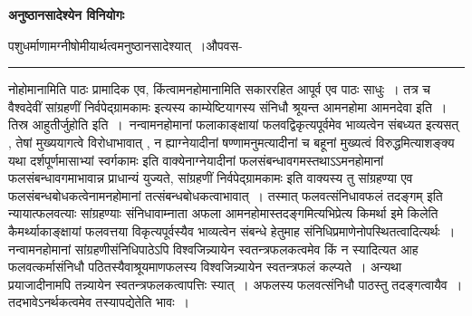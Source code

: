 \documentclass[11pt, openany]{book}
\begin{document}
\begin {center}
\textbf {अनुष्ठानसादेश्येन विनियोगः}
\end {center}

{\bl पशुधर्माणामग्नीषोमीयार्थत्वमनुष्ठानसादेश्यात्~।औपवस-\\}
\hrule
\vspace{3mm}
\noindent
नोहोमानामिति पाठः प्रामादिक एव, किंत्वामनहोमानामिति सकाररहित आपूर्व एव पाठः साधुः~। तत्र च {\qt वैश्वदेवीं सांग्रहणीं निर्वपेद्ग्रामकामः} इत्यस्य काम्येष्टियागस्य संनिधौ श्रूयन्त आमनहोमा {\qt आम\footnotemark नदेवा इति~। तिस्र आहुतीर्जुहोति} इति~।~{\br नन्वा}मनहोमानां फलाकाङ्क्षायां फलवद्विकृत्यपूर्वमेव भाव्यत्वेन संबध्यत इत्यसत् , तेषां मुख्ययागत्वे विरोधाभावात् , न ह्याग्नेयादीनां षण्णामनुमत्यादीनां च बहूनां मुख्यत्वं विरुद्धमित्याशङ्क्य यथा {\qt दर्शपूर्णमासाभ्यां स्वर्गकामः} इति
वाक्येनाग्नेयादीनां फलसंबन्धावगमस्तथाऽऽमनहोमानां फलसंबन्धावगमाभावान्न प्राधान्यं युज्यते, {\qt सांग्रहणीं निर्वपेद्ग्रामकामः} इति वाक्यस्य तु सांग्रहण्या एव फलसंबन्धबोधकत्वेनामनहोमानां तत्संबन्धबोधकत्वाभावात्~। तस्मात् {\qt फलवत्संनिधावफलं तदङ्गम्} इति न्यायात्फलवत्याः सांग्रहण्याः संनिधावाम्नाता अफला आमनहोमास्तदङ्गमित्यभिप्रेत्य किमर्था इमे किलेति कैमर्थ्याकाङ्क्षायां फलवत्तया विकृत्यपूर्वस्यैव भाव्यत्वेन संबन्धे हेतुमाह संनिधिप्रमाणेनोपस्थितत्वादित्यर्थः~। {\br नन्वा}मनहोमानां सांग्रहणीसंनिधिपाठेऽपि विश्वजिन्न्यायेन स्वतन्त्रफलकत्वमेव किं न स्यादित्यत आह फलवत्कर्मासंनिधौ पठितस्यैवाश्रूयमाणफलस्य विश्वजिन्न्यायेन स्वतन्त्रफलं कल्प्यते~। अन्यथा प्रयाजादीनामपि तन्न्यायेन स्वतन्त्रफलकत्वापत्तिः
स्यात्~। अफलस्य फलवत्संनिधौ पाठस्तु तदङ्गत्वायैव~। तदभावेऽनर्थकत्वमेव तस्यापद्येतेति भावः~।\\
\end{document}

